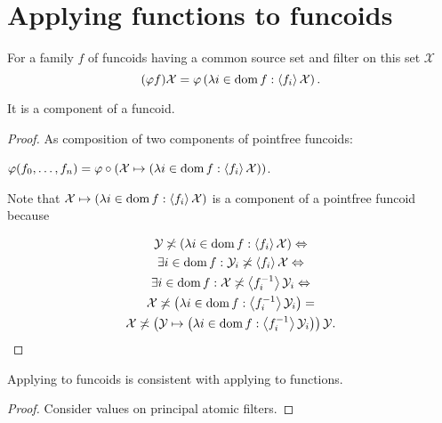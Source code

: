 \section{Applying functions to funcoids}

\begin{defn}
For a family $f$ of funcoids having a common source set and filter on this set
  $\mathcal{X}$
\[(\varphi f) \mathcal{X} = \varphi \left( \lambda i \in \operatorname{dom} f :
  \left\langle f_i\right\rangle \mathcal{X} \right) .\]
\end{defn}

\begin{prop}
  It is a component of a funcoid.
\end{prop}

\begin{proof}
  As composition of two components of pointfree funcoids:
  
  $\varphi (f_0, \ldots, f_n) = \varphi \circ \left( \mathcal{X} \mapsto
  \left( \lambda i \in \operatorname{dom} f : \left\langle f_i\right\rangle \mathcal{X} \right)
  \right)$.
  
  Note that $\mathcal{X} \mapsto \left( \lambda i \in \operatorname{dom} f :
  \left\langle f_i\right\rangle \mathcal{X} \right)$ is a component of a pointfree funcoid because
  
\begin{multline*}
  \mathcal{Y} \not\asymp \left( \lambda i \in \operatorname{dom} f : \left\langle f_i\right\rangle
  \mathcal{X} \right) \Leftrightarrow\\ \exists i \in \operatorname{dom} f :
  \mathcal{Y}_i \not\asymp \left\langle f_i\right\rangle \mathcal{X} \Leftrightarrow\\ \exists i \in
  \operatorname{dom} f : \mathcal{X} \not\asymp \left\langle f_i^{- 1}\right\rangle \mathcal{Y}_i
  \Leftrightarrow\\ \mathcal{X} \not\asymp \left( \lambda i \in \operatorname{dom} f :
  \left\langle f_i^{- 1}\right\rangle \mathcal{Y}_i \right) =\\ \mathcal{X} \not\asymp \left(
  \mathcal{Y} \mapsto \left( \lambda i \in \operatorname{dom} f : \left\langle f_i^{- 1}\right\rangle
  \mathcal{Y}_i \right) \right) \mathcal{Y}.
\end{multline*}
\end{proof}

\begin{prop}
  Applying to funcoids is consistent with applying to functions.
\end{prop}

\begin{proof}
  Consider values on principal atomic filters.
\end{proof}

